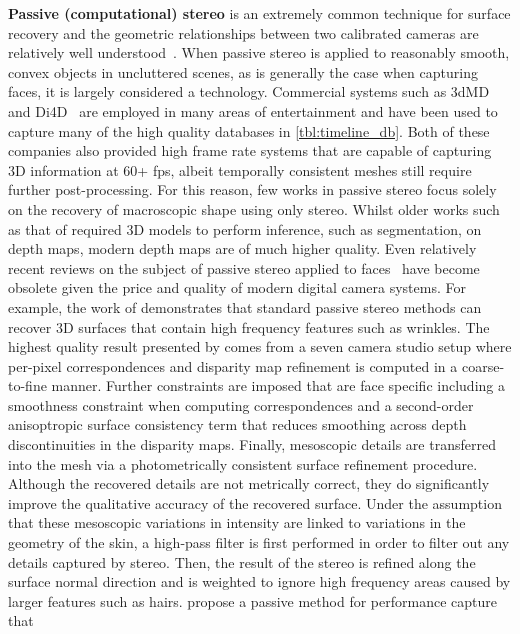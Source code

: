 \textbf{Passive (computational) stereo} is an extremely common technique for
surface recovery and the geometric relationships between two calibrated cameras
are relatively well
understood~\cite{barnard1982computational,seitz2006comparison}. When passive
stereo is applied to reasonably smooth, convex objects in uncluttered scenes, as
is generally the case when capturing faces, it is largely considered a
technology. Commercial systems such as 3dMD~\cite{3dmd} and Di4D~\cite{di4d} are
employed in many areas of entertainment and have been used to capture many of
the high quality databases in \cref{tbl:timeline_db}. Both of these companies
also provided high frame rate systems that are capable of capturing 3D
information at 60+ fps, albeit temporally consistent meshes still require
further post-processing. For this reason, few works in passive stereo focus
solely on the recovery of macroscopic shape using only stereo. Whilst older
works such as that of \citet{Lengagne:1996ej} required 3D models to perform
inference, such as segmentation, on depth maps, modern depth maps are of much
higher quality. Even relatively recent reviews on the subject of passive stereo
applied to faces~\cite{Leclercq:2005ee} have become obsolete given the price and
quality of modern digital camera systems. For example, the work of
\citet{Beeler:2010dg} demonstrates that standard passive stereo methods can
recover 3D surfaces that contain high frequency features such as wrinkles.
The highest quality result presented by \citet{Beeler:2010dg} comes from a seven
camera studio setup where per-pixel correspondences and disparity map refinement
is computed in a coarse-to-fine manner. Further constraints are imposed that are
face specific including a smoothness constraint when computing correspondences
and a second-order anisoptropic surface consistency term that reduces smoothing
across depth discontinuities in the disparity maps. Finally, mesoscopic details
are transferred into the mesh via a photometrically consistent surface
refinement procedure. Although the recovered details are not metrically correct,
they do significantly improve the qualitative accuracy of the recovered surface.
Under the assumption that these mesoscopic variations in intensity are linked to
variations in the geometry of the skin, a high-pass filter is first performed in
order to filter out any details captured by stereo. Then, the result of the
stereo is refined along the surface normal direction and is weighted to ignore
high frequency areas caused by larger features such as hairs. 
\citet{bradley2010high} propose a passive method for performance capture that
